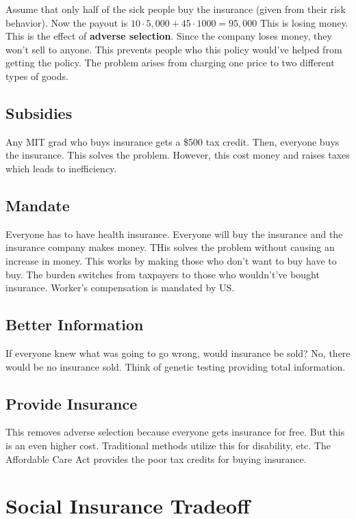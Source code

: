\documentclass{article}
\begin{document}
Assume that only half of the sick people buy the insurance (given from their
risk behavior). Now the payout is $ 10 \cdot 5,000 + 45 \cdot 1000 = 95,000 $
This is losing money. This is the effect of \textbf{adverse selection}. Since
the company loses money, they won't sell to anyone. This prevents people who
this policy would've helped from getting the policy. The problem arises from
charging one price to two different types of goods. 

\subsection{ Subsidies }

Any MIT grad who buys insurance gets a \$500 tax credit. Then, everyone buys the
insurance. This solves the problem. However, this cost money and raises taxes
which leads to inefficiency. 

\subsection{ Mandate }

Everyone has to have health insurance. Everyone will buy the insurance and the
insurance company makes money. THis solves the problem without causing an
increase in money. This works by making those who don't want to buy have to buy.
The burden switches from taxpayers to those who wouldn't've bought insurance.
Worker's compensation is mandated by US.

\subsection{ Better Information }

If everyone knew what was going to go wrong, would insurance be sold? No, there
would be no insurance sold. Think of genetic testing providing total
information.

\subsection{ Provide Insurance }

This removes adverse selection because everyone gets insurance for free. But
this is an even higher cost. Traditional methods utilize this for disability,
etc. The Affordable Care Act provides the poor tax credits for buying insurance.

\section{ Social Insurance Tradeoff }
\end{document}
